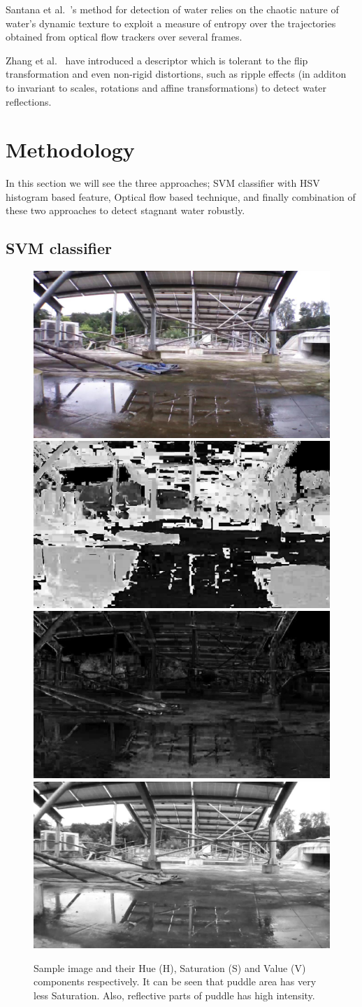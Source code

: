 \documentclass[times,10pt,twocolumn,letterpaper]{article}
\begin{document}
Santana et al.~\cite{santana12}'s method for detection of water relies on the
chaotic nature of water’s dynamic texture to exploit a measure of entropy over the
trajectories obtained from optical flow trackers over several frames.

Zhang et al.~\cite{zhang10} have introduced a descriptor which is tolerant
to the flip transformation and even non-rigid distortions, such as ripple
effects (in additon to invariant to scales, rotations and affine
transformations) to detect water reflections.

\section{Methodology}
In this section we will see the three approaches; SVM classifier with HSV
histogram based feature, Optical flow based technique, and finally combination
of these two approaches to detect stagnant water robustly.

\subsection{SVM classifier}

\begin{figure}[h!]
\centering
\includegraphics[width=0.22\linewidth]{images/IMG_PAIR_27_1.jpg}
\includegraphics[width=0.22\linewidth]{images/IMG_PAIR_27_1_H.jpg}
\includegraphics[width=0.22\linewidth]{images/IMG_PAIR_27_1_S.jpg}
\includegraphics[width=0.22\linewidth]{images/IMG_PAIR_27_1_V.jpg}
\caption{Sample image and their Hue (H), Saturation (S) and Value (V) components
respectively. It can be seen that puddle area has very less Saturation. Also,
reflective parts of puddle has high intensity.}
\label{fig:HSV}
\end{figure}
\end{document}
